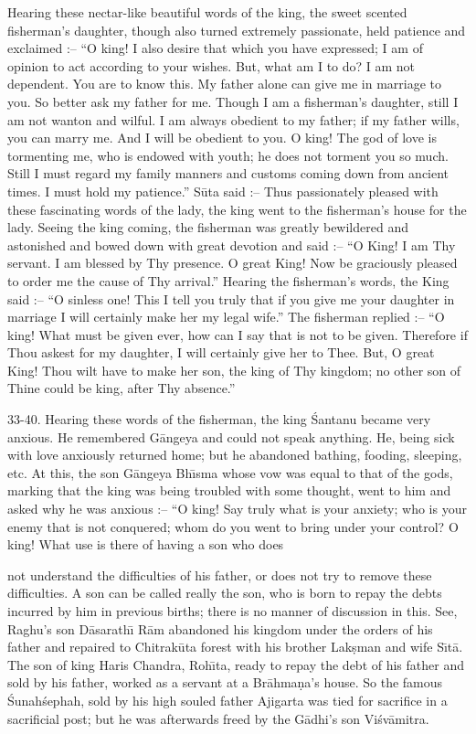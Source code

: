 Hearing these nectar-like beautiful words of the king, the sweet scented fisherman's daughter, though also turned extremely passionate, held patience and exclaimed :-- ``O king! I also desire that which you have expressed; I am of opinion to act according to your wishes. But, what am I to do? I am not dependent. You are to know this. My father alone can give me in marriage to you. So better ask my father for me. Though I am a fisherman's daughter, still I am not wanton and wilful. I am always obedient to my father; if my father wills, you can marry me. And I will be obedient to you. O king! The god of love is tormenting me, who is endowed with youth; he does not torment you so much. Still I must regard my family manners and customs coming down from ancient times. I must hold my patience.'' S\=uta said :-- Thus passionately pleased with these fascinating words of the lady, the king went to the fisherman's house for the lady. Seeing the king coming, the fisherman was greatly bewildered and astonished and bowed down with great devotion and said :-- ``O King! I am Thy servant. I am blessed by Thy presence. O great King! Now be graciously pleased to order me the cause of Thy arrival.'' Hearing the fisherman's words, the King said :-- ``O sinless one! This I tell you truly that if you give me your daughter in marriage I will certainly make her my legal wife.'' The fisherman replied :-- ``O king! What must be given ever, how can I say that is not to be given. Therefore if Thou askest for my daughter, I will certainly give her to Thee. But, O great King! Thou wilt have to make her son, the king of Thy kingdom; no other son of Thine could be king, after Thy absence.''

33-40. Hearing these words of the fisherman, the king \'Santanu became very anxious. He remembered G\=angeya and could not speak anything. He, being sick with love anxiously returned home; but he abandoned bathing, fooding, sleeping, etc. At this, the son G\=angeya Bh\={\i}sma whose vow was equal to that of the gods, marking that the king was being troubled with some thought, went to him and asked why he was anxious :-- ``O king! Say truly what is your anxiety; who is your enemy that is not conquered; whom do you went to bring under your control? O king! What use is there of having a son who does

not understand the difficulties of his father, or does not try to remove these difficulties. A son can be called really the son, who is born to repay the debts incurred by him in previous births; there is no manner of discussion in this. See, Raghu's son D\=asarath\={\i} R\=am abandoned his kingdom under the orders of his father and repaired to Chitrak\=uta forest with his brother Lak\d{s}man and wife S\={\i}t\=a. The son of king Haris Chandra, Roh\={\i}ta, ready to repay the debt of his father and sold by his father, worked as a servant at a Br\=ahma\d{n}a's house. So the famous \'Sunah\'sephah, sold by his high souled father Ajigarta was tied for sacrifice in a sacrificial post; but he was afterwards freed by the G\=adhi's son Vi\'sv\=amitra.

